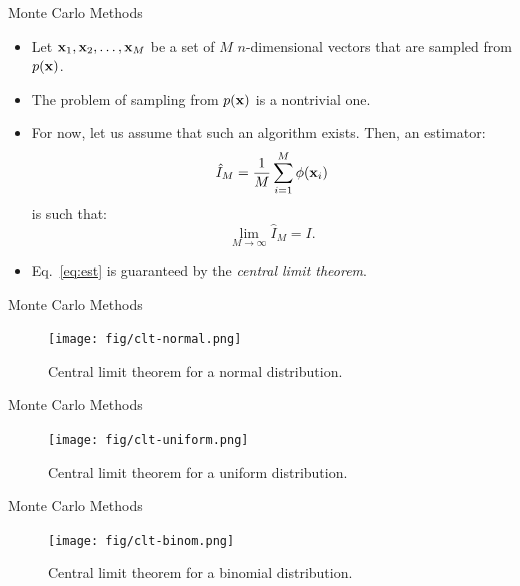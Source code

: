 \documentclass[10pt]{beamer}
\begin{document}
\begin{frame}{Monte Carlo Methods}
\begin{itemize}
\setlength\itemsep{1em}
  \item Let ${\bf x}_1, {\bf x}_2, \dots, {\bf x}_M$ be a set of $M$ $n$-dimensional vectors that are sampled from $p({\bf x})$.

  \item The problem of sampling from $p({\bf x})$ is a nontrivial one.

  \item For now, let us assume that such an algorithm exists. Then, an estimator:
  \begin{equation}
    \hat{I}_M = \frac{1}{M}\sum_{i=1}^M \phi({\bf x}_i)
  \end{equation}
  is such that:
  \begin{equation}
  \label{eq:est}
    \lim_{M\rightarrow\infty} \hat{I}_M = I.
  \end{equation}

  \item Eq.~\ref{eq:est} is guaranteed by the \textit{central limit theorem}.
\end{itemize}
\end{frame}

\begin{frame}{Monte Carlo Methods}
\begin{figure}
\centering
  \texttt{[image: fig/clt-normal.png]}
  \caption{Central limit theorem for a normal distribution.}
\end{figure}
\end{frame}

\begin{frame}{Monte Carlo Methods}
\begin{figure}
\centering
  \texttt{[image: fig/clt-uniform.png]}
  \caption{Central limit theorem for a uniform distribution.}
\end{figure}
\end{frame}

\begin{frame}{Monte Carlo Methods}
\begin{figure}
\centering
  \texttt{[image: fig/clt-binom.png]}
  \caption{Central limit theorem for a binomial distribution.}
\end{figure}
\end{frame}
\end{document}
